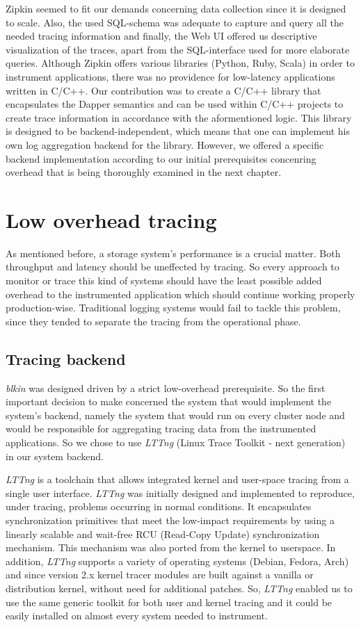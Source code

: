 \documentclass[a4paper,10pt,twocolumn]{article}
\begin{document}
Zipkin seemed to fit our demands concerning data collection since it is designed
to scale. Also, the used SQL-schema was adequate to capture and query all the
needed tracing information and finally, the Web UI offered us descriptive
visualization of the traces, apart from the SQL-interface used for more
elaborate queries. Although Zipkin offers various libraries (Python, Ruby,
Scala) in order to instrument applications, there was no providence for
low-latency applications written in C/C++. Our contribution was to create a
C/C++ library that encapsulates the Dapper semantics and can be used within
C/C++ projects to create trace information in accordance with the aformentioned
logic. This library is designed to be backend-independent, which means that one
can implement his own log aggregation backend for the library. However, we
offered a specific backend implementation according to our initial prerequisites
concenring overhead that is being thoroughly examined in the next chapter.

\section{Low overhead tracing} As mentioned before, a storage system's
performance is a crucial matter. Both throughput and latency should be
uneffected by tracing. So every approach to monitor or trace this kind of
systems should have the least possible added overhead to the instrumented
application which should continue working properly production-wise. Traditional
logging systems would fail to tackle this problem, since they tended to separate
the tracing from the operational phase.

\subsection{Tracing backend} \emph{blkin} was designed driven by a strict
low-overhead prerequisite. So the first important decision to make concerned the
system that would implement the system's backend, namely the system that would
run on every cluster node and would be responsible for aggregating tracing data
from the instrumented applications. So we chose to use \emph{LTTng} (Linux Trace
Toolkit - next generation)\cite{lttng} in our system backend.

\emph{LTTng} is a toolchain that allows integrated kernel and user-space tracing
from a single user interface. \emph{LTTng} was initially designed and
implemented to reproduce, under tracing, problems occurring in normal
conditions. It encapsulates synchronization primitives that meet the low-impact
requirements by using a linearly scalable and wait-free RCU (Read-Copy Update)
synchronization mechanism. This mechanism was also ported from the kernel to
userspace. In addition, \emph{LTTng} supports a variety of operating systems
(Debian, Fedora, Arch) and since version 2.x kernel tracer modules are built
against a vanilla or distribution kernel, without need for additional patches.
So, \emph{LTTng} enabled us to use the same generic toolkit for both user and
kernel tracing and it could be easily installed on almost every system needed to
instrument. 
\end{document}
